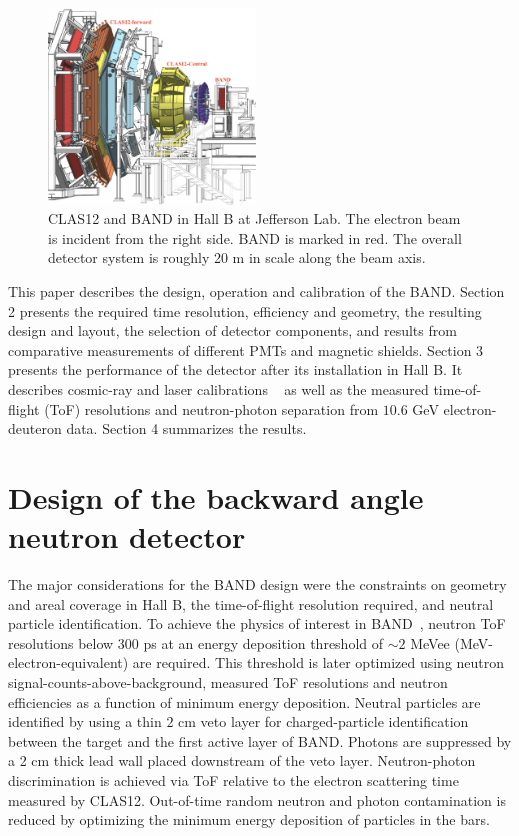 \documentclass[3p,final,twocolumn]{elsarticle}
\begin{document}
\begin{figure}[t!]
	\centering
	\includegraphics[width=0.49\textwidth]{BandInClas.png}
        \caption{CLAS12 and BAND in Hall B at Jefferson Lab. The
          electron beam is incident from the right side. BAND is
          marked in red. The overall detector system is roughly 20
          \si{\meter} in scale along the beam axis. }
		\label{fig:clas12band}
\end{figure}
This paper describes the design, operation and calibration of the BAND.
Section 2 presents the required time resolution, efficiency and
geometry, the resulting design and layout, the selection of detector
components, and results from comparative measurements of different
PMTs and magnetic shields. Section 3 presents the performance of the
detector after its installation in Hall B. It describes cosmic-ray and
laser calibrations ~\cite{band-laser} as well as the measured
time-of-flight (ToF) resolutions and neutron-photon separation from
$10.6$ \si{\GeV} electron-deuteron data. Section 4 summarizes the
results.




\section{Design of the backward angle neutron detector}
The major considerations for the BAND design were the constraints on
geometry and areal coverage in Hall B, the time-of-flight resolution
required, and neutral particle identification.  To achieve the physics
of interest in BAND~\cite{band-proposal}, neutron ToF
resolutions below $300$ \si{\pico\second} at an energy deposition
threshold of $\sim 2$ MeVee (MeV-electron-equivalent) are required. 
This threshold is later optimized using neutron signal-counts-above-background,
measured ToF resolutions and neutron efficiencies as a function of minimum energy deposition.
Neutral particles are
identified by using a thin $2$ \si{\centi\meter} veto layer for
charged-particle identification between the target and the first
active layer of BAND. Photons are suppressed by a 2 \si{\centi\meter}
thick lead wall placed downstream of the veto layer. Neutron-photon
discrimination is achieved via ToF relative to the electron scattering
time measured by CLAS12. Out-of-time random neutron and photon
contamination is reduced by optimizing the minimum energy deposition of particles in the bars.
\end{document}
